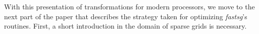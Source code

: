 % 
% 
% 

With this presentation of transformations for modern processors, we move to the
next part of the paper that describes the strategy taken for optimizing
\textit{fastsg}'s routines. First, a short introduction in the domain of sparse
grids is necessary.
